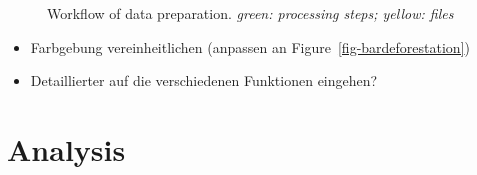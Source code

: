 \documentclass[
  letterpaper,
  DIV=11,
  numbers=noendperiod]{scrreprt}
\begin{document}
\begin{figure}

\begin{minipage}[t]{\linewidth}

{\centering 


}

\end{minipage}%
\newline
\begin{minipage}[t]{\linewidth}

{\centering 


}

\end{minipage}%

\caption{\label{fig-data_preparation}Workflow of data preparation.
\emph{green: processing steps; yellow: files}}

\end{figure}

\begin{itemize}
\item
  Farbgebung vereinheitlichen (anpassen an
  Figure~\ref{fig-bardeforestation})
\item
  Detaillierter auf die verschiedenen Funktionen eingehen?
\end{itemize}

\hypertarget{analysis}{%
\section{Analysis}\label{analysis}}
\end{document}
